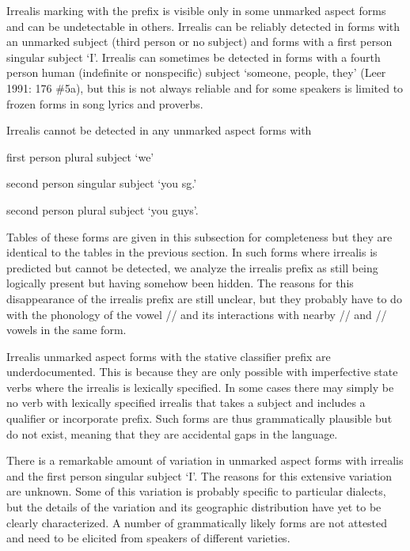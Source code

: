 \begin{multicols}{2}
Irrealis marking with the  prefix is visible only in some unmarked aspect forms and can be undetectable in others.
Irrealis can be reliably detected in forms with an unmarked subject (third person or no subject) and forms with a first person singular subject  ‘I’.
Irrealis can sometimes be detected in forms with a fourth person human (indefinite or nonspecific) subject  ‘someone, people, they’ (Leer 1991: 176 \#5a), but this is not always reliable and for some speakers is limited to frozen forms in song lyrics and proverbs.

Irrealis cannot be detected in any unmarked aspect forms with
\begin{inlineenum}
	\item	first person plural subject  ‘we’
	\item	second person singular subject  ‘you sg.’
	\item	second person plural subject  ‘you guys’.
\end{inlineenum}
Tables of these forms are given in this subsection for completeness but they are identical to the tables in the previous section.
In such forms where irrealis  is predicted but cannot be detected, we analyze the irrealis prefix as still being logically present but having somehow been hidden.
The reasons for this disappearance of the irrealis prefix are still unclear, but they probably have to do with the phonology of the vowel // and its interactions with nearby // and // vowels in the same form.

Irrealis unmarked aspect forms with the stative classifier prefix  are underdocumented.
This is because they are only possible with imperfective state verbs where the irrealis  is lexically specified.
In some cases there may simply be no verb with lexically specified irrealis  that takes a subject and includes a qualifier or incorporate prefix.
Such forms are thus grammatically plausible but do not exist, meaning that they are accidental gaps in the language.

There is a remarkable amount of variation in unmarked aspect forms with irrealis  and the first person singular subject  ‘I’.
The reasons for this extensive variation are unknown.
Some of this variation is probably specific to particular dialects, but the details of the variation and its geographic distribution have yet to be clearly characterized.
A number of grammatically likely forms are not attested and need to be elicited from speakers of different varieties.
\end{multicols}

